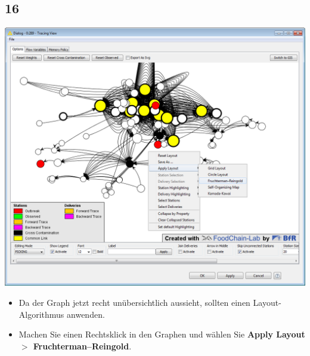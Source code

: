 \documentclass{beamer}
\begin{document}
\subsection{16}
\begin{frame}
	\begin{center}
  		\includegraphics[height=0.6\textheight]{16.png}
	\end{center}
	\begin{itemize}
		\item Da der Graph jetzt recht unübersichtlich aussieht, sollten einen Layout-Algorithmus anwenden.
		\item Machen Sie einen Rechtsklick in den Graphen und wählen Sie \textbf{Apply Layout $>$ Fruchterman–Reingold}.
	\end{itemize}
\end{frame}
\end{document}
